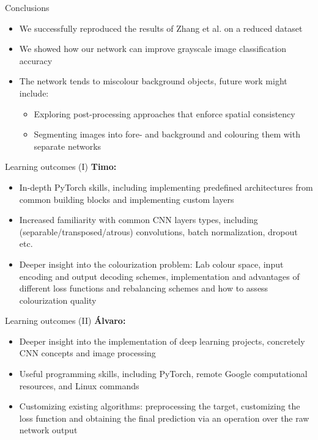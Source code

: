 \documentclass{beamer}
\begin{document}

\begin{frame}{Conclusions}
  \begin{itemize}
    \item We successfully reproduced the results of Zhang et al. on a reduced dataset
    \item We showed how our network can improve grayscale image classification accuracy
    \item The network tends to miscolour background objects, future work might include: \\
      \begin{itemize}
        \item Exploring post-processing approaches that enforce spatial consistency
        \item Segmenting images into fore- and background and colouring them with
              separate networks
      \end{itemize}
  \end{itemize}
\end{frame}


\begin{frame}{Learning outcomes (I)}
  \textbf{Timo:}
    \begin{itemize}
      \item In-depth PyTorch skills, including implementing predefined
            architectures from common building blocks and implementing custom
            layers
      \item Increased familiarity with common CNN layers types, including
            (separable/transposed/atrous) convolutions, batch normalization,
            dropout etc.
      \item Deeper insight into the colourization problem: Lab colour space,
            input encoding and output decoding schemes, implementation and
            advantages of different loss functions and rebalancing schemes and
            how to assess colourization quality
    \end{itemize}
\end{frame}

\begin{frame}{Learning outcomes (II)}
  \textbf{Álvaro:}
    \begin{itemize}
      \item Deeper insight into the implementation of deep learning projects,
            concretely CNN concepts and image processing
      \item Useful programming skills, including PyTorch, remote Google
            computational resources, and Linux commands
      \item Customizing existing algorithms: preprocessing the target,
            customizing the loss function and obtaining the final prediction via
            an operation over the raw network output
    \end{itemize}
\end{frame}
\end{document}
